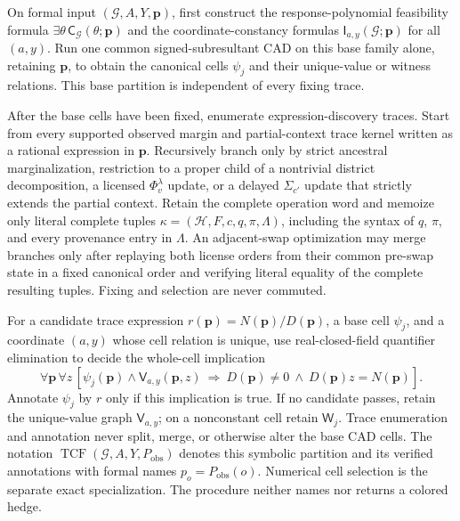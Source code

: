 On formal input \((\mathcal G,A,Y,\mathbf p)\), first construct the response-polynomial feasibility formula \(\exists\theta\,\mathsf C_{\mathcal G}(\theta;\mathbf p)\) and the coordinate-constancy formulas \(\mathsf I_{a,y}(\mathcal G;\mathbf p)\) for all \((a,y)\). Run one common signed-subresultant CAD on this base family alone, retaining \(\mathbf p\), to obtain the canonical cells \(\psi_j\) and their unique-value or witness relations. This base partition is independent of every fixing trace.

After the base cells have been fixed, enumerate expression-discovery traces. Start from every supported observed margin and partial-context trace kernel written as a rational expression in \(\mathbf p\). Recursively branch only by strict ancestral marginalization, restriction to a proper child of a nontrivial district decomposition, a licensed \(\Phi_v^{\lambda}\) update, or a delayed \(\Sigma_{c'}\) update that strictly extends the partial context. Retain the complete operation word and memoize only literal complete tuples \(\kappa=(\mathcal H,F,c,q,\pi,\Lambda)\), including the syntax of \(q\), \(\pi\), and every provenance entry in \(\Lambda\). An adjacent-swap optimization may merge branches only after replaying both license orders from their common pre-swap state in a fixed canonical order and verifying literal equality of the complete resulting tuples. Fixing and selection are never commuted.

For a candidate trace expression \(r(\mathbf p)=N(\mathbf p)/D(\mathbf p)\), a base cell \(\psi_j\), and a coordinate \((a,y)\) whose cell relation is unique, use real-closed-field quantifier elimination to decide the whole-cell implication
\[
\forall\mathbf p\,\forall z\,
\left[
\psi_j(\mathbf p)\wedge\mathsf V_{a,y}(\mathbf p,z)
\ \Longrightarrow\ D(\mathbf p)\neq0\ \wedge\ D(\mathbf p)z=N(\mathbf p)
\right].
\]
Annotate \(\psi_j\) by \(r\) only if this implication is true. If no candidate passes, retain the unique-value graph \(\mathsf V_{a,y}\); on a nonconstant cell retain \(\mathsf W_j\). Trace enumeration and annotation never split, merge, or otherwise alter the base CAD cells. The notation \(\operatorname{TCF}(\mathcal G,A,Y,P_{\mathrm{obs}})\) denotes this symbolic partition and its verified annotations with formal names \(p_o=P_{\mathrm{obs}}(o)\). Numerical cell selection is the separate exact specialization. The procedure neither names nor returns a colored hedge.
